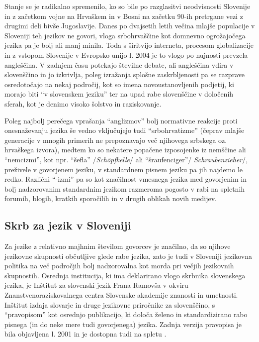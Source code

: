 \begin{multicols}{2}

Stanje se je radikalno spremenilo, ko so bile po razglasitvi neodvisnosti Slovenije in z začetkom vojne na Hrvaškem in v Bosni na začetku 90-ih pretrgane vezi z drugimi deli bivše Jugoslavije. Danes po dvajsetih letih večina mlajše populacije v Sloveniji teh jezikov ne govori, vloga srbohrvaščine kot domnevno ogrožajočega jezika pa je bolj ali manj minila. Toda s širitvijo interneta, procesom globalizacije in z vstopom Slovenije v Evropsko unijo l. 2004 je to vlogo po nujnosti prevzela angleščina. V zadnjem času potekajo številne debate, ali angleščina vdira v slovenščino in jo izkrivlja, poleg izražanja splošne zaskrbljenosti pa se razprave osredotočajo na nekaj področij, kot so imena novoustanovljenih podjetij, ki morajo biti “v slovenskem jeziku” ter na upad rabe slovenščine v določenih sferah, kot je denimo visoko šolstvo in raziskovanje.

Poleg najbolj perečega vprašanja “anglizmov” bolj normativne reakcije proti onesnaževanju jezika še vedno vključujejo tudi “srbohrvatizme” (čeprav mlajše generacije v mnogih primerih ne prepoznavajo več njihovega srbskega oz. hrvaškega izvora), medtem ko so nekatere popačene izposojenke iz nemščine ali “nemcizmi”, kot npr. “šefla” /\textit{Schöpfkelle}/ ali ``šraufenciger''/ \textit{Schraubenzieher}/, preživele v govorjenem jeziku, v standardnem pisnem jeziku pa jih najdemo le redko. Raz\-lični “-izmi” pa so kot značilnost vmesnega jezika med govorjenim in bolj nadzorovanim standardnim jezikom razmeroma pogosto v rabi na spletnih forumih, blogih, kratkih sporočilih in v drugih oblikah novih medijev.

\subsection{Skrb za jezik v Sloveniji}

Za jezike z relativno majhnim številom govorcev je značilno, da so njihove jezikovne skupnosti občutljive glede rabe jezika, zato je tudi v Sloveniji jezikovna politika na več področjih bolj nadzorovalna kot morda pri večjih jezikovnih skupnostih. Osrednja institucija, ki ima deklarirano vlogo skrbnika slovenskega jezika, je Inštitut za slovenski jezik Frana Ramovša v okviru Znanstvenoraziskovalnega centra Slovenske akademije znanosti in umetnosti. Inštitut izdaja slovarje in druge jezikovne priročnike za slovenščino, s “pravopisom” kot osrednjo publikacijo, ki določa želeno in standardizirano rabo pisnega (in do neke mere tudi govorjenega) jezika. Zadnja verzija pravopisa je bila objavljena l. 2001 in je dostopna tudi na spletu \cite{ISJFR1}.


\end{multicols}
